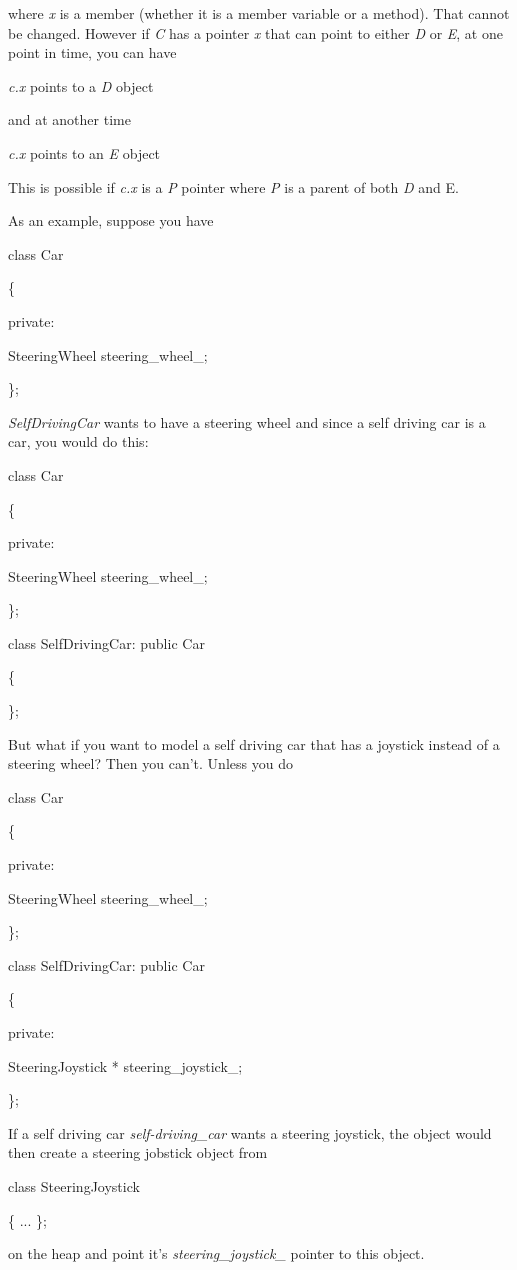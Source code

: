 \documentclass[
]{article}
\begin{document}
where \emph{x} is a member (whether it is a member variable or a
method). That cannot be changed. However if \emph{C} has a pointer
\emph{x} that can point to either \emph{D} or \emph{E}, at one point in
time, you can have

\emph{c.x} points to a \emph{D} object

and at another time

\emph{c.x} points to an \emph{E} object

This is possible if \emph{c.x} is a \emph{P} pointer where \emph{P} is a
parent of both \emph{D} and E.

As an example, suppose you have

class Car

\{

private:

SteeringWheel steering\_wheel\_;

\};

\emph{SelfDrivingCar} wants to have a steering wheel and since a self
driving car is a car, you would do this:

class Car

\{

private:

SteeringWheel steering\_wheel\_;

\};

class SelfDrivingCar: public Car

\{

\};

But what if you want to model a self driving car that has a joystick
instead of a steering wheel? Then you can't. Unless you do

class Car

\{

private:

SteeringWheel steering\_wheel\_;

\};

class SelfDrivingCar: public Car

\{

private:

SteeringJoystick * steering\_joystick\_;

\};

If a self driving car \emph{self-driving\_car} wants a steering
joystick, the object would then create a steering jobstick object from

class SteeringJoystick

\{ ... \};

on the heap and point it's \emph{steering\_joystick\_} pointer to this
object.
\end{document}
